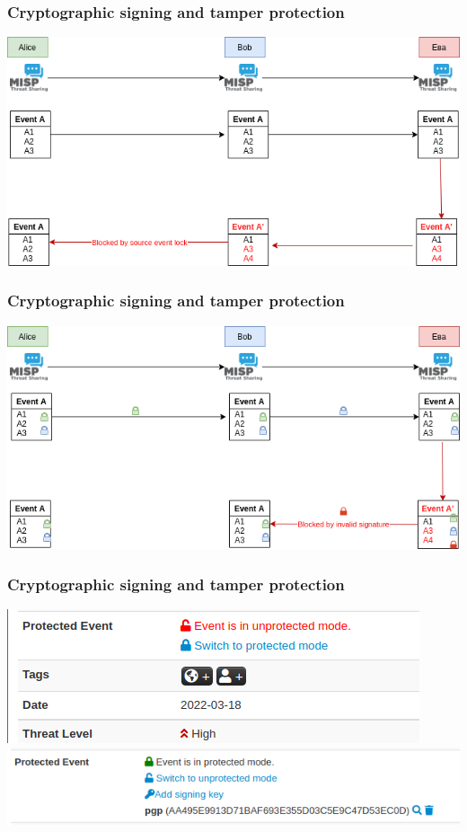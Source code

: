 \begin{frame}
\frametitle{Cryptographic signing and tamper protection}
\includegraphics[scale=0.5]{images/signing1.png}
\end{frame}

\begin{frame}
\frametitle{Cryptographic signing and tamper protection}
\includegraphics[scale=0.5]{images/signing2.png}
\end{frame}

\begin{frame}
\frametitle{Cryptographic signing and tamper protection}
\includegraphics[scale=0.6]{images/signing3.png}
\includegraphics[scale=0.6]{images/signing4.png}
\end{frame}

